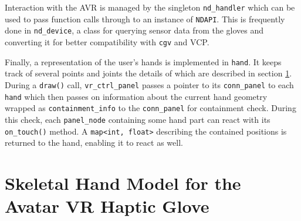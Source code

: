 \documentclass[hyperref, bachelorofscience]{cgvpub}
\begin{document}
Interaction with the \Gls{AVR} is managed by the singleton \lstinline|nd_handler| which can be used to pass function calls through to an instance of \lstinline|NDAPI|. This is frequently done in \lstinline|nd_device|, a class for querying sensor data from the gloves and converting it for better compatibility with \lstinline|cgv| and \gls{VCP}.

Finally, a representation of the user's hands is implemented in \lstinline|hand|. It keeps track of several points and joints the details of which are described in section \ref{sec:hand_model}. During a \lstinline|draw()| call, \lstinline|vr_ctrl_panel| passes a pointer to its \lstinline|conn_panel| to each \lstinline|hand| which then passes on information about the current hand geometry wrapped as \lstinline|containment_info| to the \lstinline|conn_panel| for containment check. During this check, each \lstinline|panel_node| containing some hand part can react with its \lstinline|on_touch()| method. A \lstinline|map<int, float>| describing the contained positions is returned to the hand, enabling it to react as well.

\section{Skeletal Hand Model for the Avatar VR Haptic Glove} \label{sec:hand_model}
\end{document}
